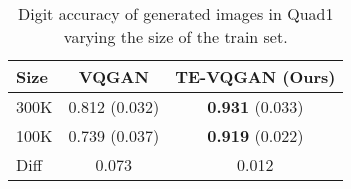 \begin{table}[ht]
\footnotesize
\centering
\caption{Digit accuracy of generated images in Quad1 varying the size of the train set.}
\begin{tabular}{lcc}
\hline
Size & VQGAN & TE-VQGAN (Ours) \\ 
\hline
300K          & 0.812 (0.032)                        & \textbf{0.931} (0.033)                    \\
100K          & 0.739 (0.037)                        & \textbf{0.919} (0.022)                    \\ \hline
Diff          & 0.073                        & 0.012                    \\ \hline
\end{tabular}
\label{tab:sample_efficiency}
\vspace{-2mm}
\end{table}